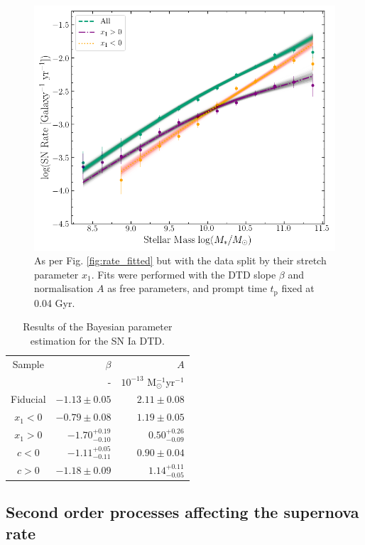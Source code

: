 \documentclass[fleqn,usenatbib]{mnras}
\begin{document}
\begin{figure}
    \centering
    \includegraphics[width=.5\textwidth]{figs/rate_vs_mass_DTD_fit_beta_norm_Qerf1.1_split_x1.png}
    \caption{As per Fig. \ref{fig:rate_fitted} but with the data split by their stretch parameter $x_1$. Fits were performed with the DTD slope $\beta$ and normalisation $A$ as free parameters, and prompt time $t_{\mathrm{p}}$ fixed at 0.04 Gyr.%
    \label{fig:rate_fitted_split_x1}}
\end{figure}

\renewcommand{\arraystretch}{1.2}
\begin{table}
	\centering
	\caption{Results of the Bayesian parameter estimation for the SN Ia DTD.}
	\label{tab:dtd_results_split_lc}
	\begin{tabular}{crr} %
		\hline
		 Sample &$\beta$ & $A$ \\
		 &-       & $10^{-13}$ M$_{\odot}^{-1}$yr$^{-1}$ \\
		\hline
		Fiducial & $-1.13\pm0.05$ &  $2.11\pm0.08$ \\
	    $x_1 < 0$ & $-0.79\pm0.08$ &  $1.19 \pm0.05$ \\
		$x_1 > 0$ & $-1.70^{+0.19}_{-0.10}$ & $0.50^{+0.26}_{-0.09}$ \\
		$c < 0$ & $-1.11^{+0.05}_{-0.11}$ & $0.90\pm0.04$ \\
		$c > 0$ & $-1.18\pm0.09$ & $1.14^{+0.11}_{-0.05}$ \\
		\hline
	\end{tabular}
\end{table}
\subsection{Second order processes affecting the supernova rate \label{subsec:discussion}}
\end{document}
